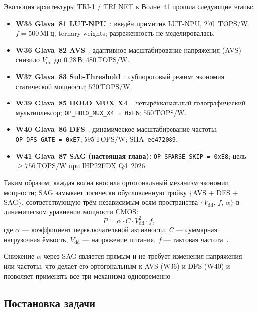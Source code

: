 Эволюция архитектуры TRI-1 / TRI NET к Волне~41 прошла следующие этапы:
\begin{itemize}
  \item \textbf{W35 Glava~81 LUT-NPU}~\cite{trios884}:
        введён примитив LUT-NPU, 270~TOPS/W, $f = 500\,\text{МГц}$,
        ternary weights; разреженность не моделировалась.
  \item \textbf{W36 Glava~82 AVS}~\cite{trios877}:
        адаптивное масштабирование напряжения (AVS) снизило $V_{\mathrm{dd}}$
        до $0{.}28\,\text{В}$; $480\,\text{TOPS/W}$.
  \item \textbf{W37 Glava~83 Sub-Threshold}~\cite{trios882}:
        субпороговый режим; экономия статической мощности;
        $520\,\text{TOPS/W}$.
  \item \textbf{W39 Glava~85 HOLO-MUX-X4}~\cite{trios891}:
        четырёхканальный голографический мультиплексор;
        \texttt{OP\_HOLO\_MUX\_X4 = 0xE6}; $550\,\text{TOPS/W}$.
  \item \textbf{W40 Glava~86 DFS}~\cite{trios895}:
        динамическое масштабирование частоты; \texttt{OP\_DFS\_GATE = 0xE7};
        $595\,\text{TOPS/W}$; SHA~\texttt{ee472089}.
  \item \textbf{W41 Glava~87 SAG (настоящая глава):}
        \texttt{OP\_SPARSE\_SKIP = 0xE8};
        цель $\geq 756\,\text{TOPS/W}$ при IHP22FDX Q4~2026.
\end{itemize}

Таким образом, каждая волна вносила ортогональный механизм экономии
мощности; SAG замыкает логически обусловленную тройку
\{AVS + DFS + SAG\}, соответствующую трём независимым осям пространства
$\{V_{\mathrm{dd}},\, f,\, \alpha\}$ в динамическом уравнении мощности
CMOS:
\begin{equation}
  P = \alpha \cdot C \cdot V_{\mathrm{dd}}^{2} \cdot f,
  \label{eq:cmos-power-87}
\end{equation}
где $\alpha$ — коэффициент переключательной активности,
$C$ — суммарная нагрузочная ёмкость,
$V_{\mathrm{dd}}$ — напряжение питания,
$f$ — тактовая частота~\cite{Weste-Harris-CMOS4}.

Снижение $\alpha$ через SAG является прямым и не требует изменения
напряжения или частоты, что делает его ортогональным к AVS (W36) и
DFS (W40) и позволяет применять все три механизма одновременно.


\subsection{Постановка задачи}
\label{ssec:glava87-problem}

